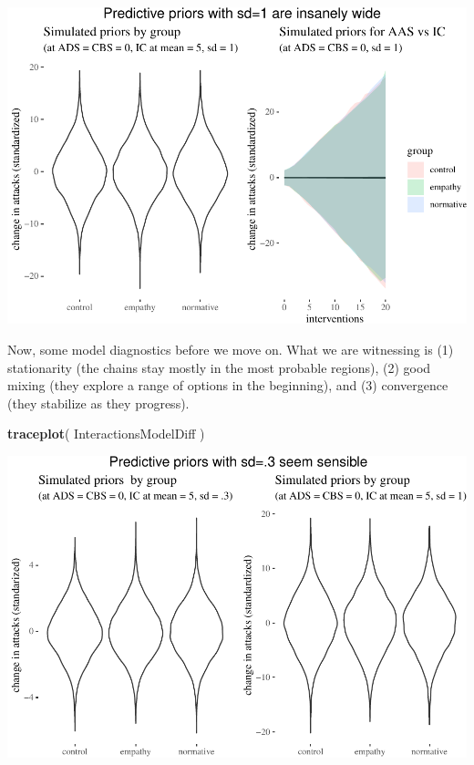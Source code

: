 \documentclass[10pt,dvipsnames,enabledeprecatedfontcommands]{scrartcl}
\newenvironment{Shaded}{\begin{snugshade}}{\end{snugshade}}
\newcommand{\KeywordTok}[1]{\textcolor[rgb]{0.13,0.29,0.53}{\textbf{#1}}}
\newcommand{\NormalTok}[1]{#1}
\begin{document}
\begin{center}\includegraphics[width=1\linewidth]{bayesianReport_files/figure-latex/unnamed-chunk-7-1} \end{center}

\normalsize

Now, some model diagnostics before we move on. What we are witnessing is
(1) stationarity (the chains stay mostly in the most probable regions),
(2) good mixing (they explore a range of options in the beginning), and
(3) convergence (they stabilize as they progress).

\vspace{1mm} \footnotesize

\begin{Shaded}
\begin{Highlighting}[]
\KeywordTok{traceplot}\NormalTok{( InteractionsModelDiff )}
\end{Highlighting}
\end{Shaded}

\begin{center}\includegraphics[width=1\linewidth]{bayesianReport_files/figure-latex/unnamed-chunk-8-1} \end{center}
\end{document}
